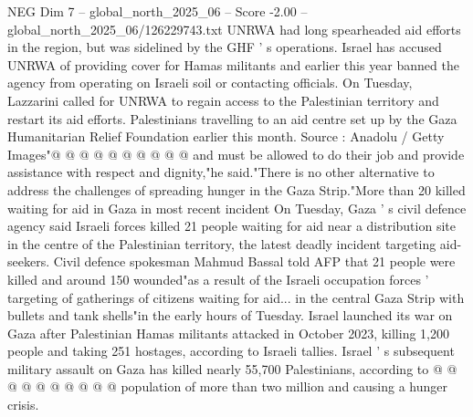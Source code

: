 \begin{textsample}{NEG Dim 7 – global\_north\_2025\_06 – Score -2.00 – global\_north\_2025\_06/126229743.txt}
UNRWA had long spearheaded aid efforts in the region, but was sidelined by the GHF ' s operations.
Israel has accused UNRWA of providing cover for Hamas militants and earlier this year banned the agency from operating on Israeli soil or contacting officials.
On Tuesday, Lazzarini called for UNRWA to regain access to the Palestinian territory and restart its aid efforts.
Palestinians travelling to an aid centre set up by the Gaza Humanitarian Relief Foundation earlier this month.
Source : Anadolu / Getty Images"@ @ @ @ @ @ @ @ @ @ and must be allowed to do their job and provide assistance with respect and dignity,"he said."There is no other alternative to address the challenges of spreading hunger in the Gaza Strip."More than 20 killed waiting for aid in Gaza in most recent incident On Tuesday, Gaza ' s civil defence agency said Israeli forces killed 21 people waiting for aid near a distribution site in the centre of the Palestinian territory, the latest deadly incident targeting aid-seekers.
Civil defence spokesman Mahmud Bassal told AFP that 21 people were killed and around 150 wounded"as a result of the Israeli occupation forces ' targeting of gatherings of citizens waiting for aid... in the central Gaza Strip with bullets and tank shells"in the early hours of Tuesday.
Israel launched its war on Gaza after Palestinian Hamas militants attacked in October 2023, killing 1,200 people and taking 251 hostages, according to Israeli tallies.
Israel ' s subsequent military assault on Gaza has killed nearly 55,700 Palestinians, according to @ @ @ @ @ @ @ @ @ @ population of more than two million and causing a hunger crisis.

\end{textsample}
